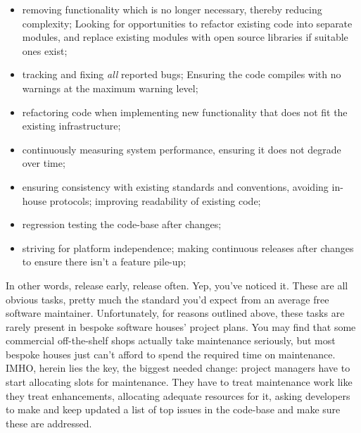 \documentclass{book}
\begin{document}
\begin{itemize}
\item removing functionality which is no longer necessary, thereby
  reducing complexity; Looking for opportunities to refactor existing
  code into separate modules, and replace existing modules with open
  source libraries if suitable ones exist;
\item tracking and fixing \emph{all} reported bugs; Ensuring the code
  compiles with no warnings at the maximum warning level;
\item refactoring code when implementing new functionality that does
  not fit the existing infrastructure;
\item continuously measuring system performance, ensuring it does not
  degrade over time;
\item ensuring consistency with existing standards and conventions,
  avoiding in-house protocols; improving readability of existing code;
\item regression testing the code-base after changes;
\item striving for platform independence; making continuous releases
  after changes to ensure there isn't a feature pile-up;
\end{itemize}

In other words, release early, release often. Yep, you've noticed
it. These are all obvious tasks, pretty much the standard you'd expect
from an average free software maintainer. Unfortunately, for reasons
outlined above, these tasks are rarely present in bespoke software
houses' project plans. You may find that some commercial off-the-shelf
shops actually take maintenance seriously, but most bespoke houses
just can't afford to spend the required time on maintenance. IMHO,
herein lies the key, the biggest needed change: project managers have
to start allocating slots for maintenance. They have to treat
maintenance work like they treat enhancements, allocating adequate
resources for it, asking developers to make and keep updated a list of
top issues in the code-base and make sure these are addressed.
\end{document}
